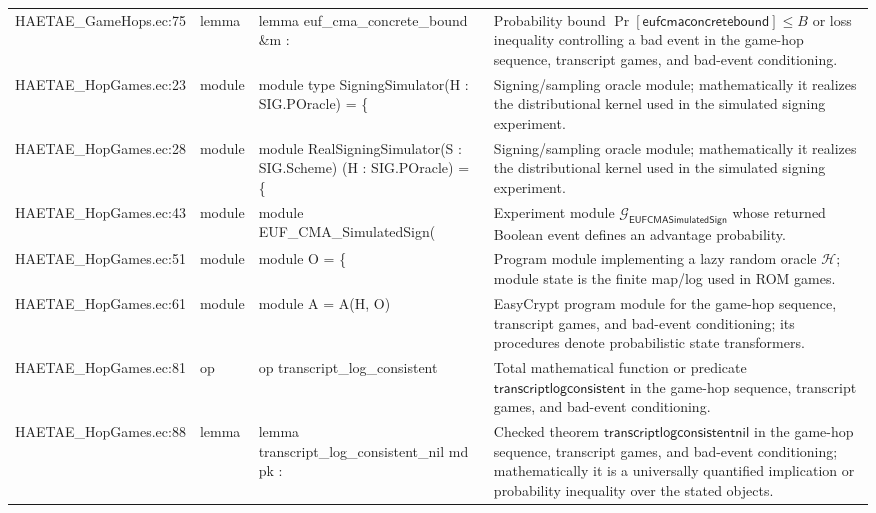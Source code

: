 \documentclass[10pt]{article}
\begin{document}
\begin{longtable}{L{0.11\textwidth}L{0.055\textwidth}L{0.385\textwidth}L{0.41\textwidth}}
HAETAE\_\allowbreak{}GameHops.\allowbreak{}ec:\allowbreak{}75 & lemma & {\ttfamily\scriptsize lemma euf\_\allowbreak{}cma\_\allowbreak{}concrete\_\allowbreak{}bound \&m :} & Probability bound $\Pr[\mathsf{eufcmaconcretebound}]\le B$ or loss inequality controlling a bad event in the game-hop sequence, transcript games, and bad-event conditioning. \\
HAETAE\_\allowbreak{}HopGames.\allowbreak{}ec:\allowbreak{}23 & module & {\ttfamily\scriptsize module type SigningSimulator(H : SIG.POracle) = \{} & Signing/sampling oracle module; mathematically it realizes the distributional kernel used in the simulated signing experiment. \\
HAETAE\_\allowbreak{}HopGames.\allowbreak{}ec:\allowbreak{}28 & module & {\ttfamily\scriptsize module RealSigningSimulator(S : SIG.Scheme) (H : SIG.POracle) = \{} & Signing/sampling oracle module; mathematically it realizes the distributional kernel used in the simulated signing experiment. \\
HAETAE\_\allowbreak{}HopGames.\allowbreak{}ec:\allowbreak{}43 & module & {\ttfamily\scriptsize module EUF\_\allowbreak{}CMA\_\allowbreak{}SimulatedSign(} & Experiment module $\mathcal G_{\mathsf{EUFCMASimulatedSign}}$ whose returned Boolean event defines an advantage probability. \\
HAETAE\_\allowbreak{}HopGames.\allowbreak{}ec:\allowbreak{}51 & module & {\ttfamily\scriptsize module O = \{} & Program module implementing a lazy random oracle $\mathcal H$; module state is the finite map/log used in ROM games. \\
HAETAE\_\allowbreak{}HopGames.\allowbreak{}ec:\allowbreak{}61 & module & {\ttfamily\scriptsize module A = A(H, O)} & EasyCrypt program module for the game-hop sequence, transcript games, and bad-event conditioning; its procedures denote probabilistic state transformers. \\
HAETAE\_\allowbreak{}HopGames.\allowbreak{}ec:\allowbreak{}81 & op & {\ttfamily\scriptsize op transcript\_\allowbreak{}log\_\allowbreak{}consistent} & Total mathematical function or predicate $\mathsf{transcriptlogconsistent}$ in the game-hop sequence, transcript games, and bad-event conditioning. \\
HAETAE\_\allowbreak{}HopGames.\allowbreak{}ec:\allowbreak{}88 & lemma & {\ttfamily\scriptsize lemma transcript\_\allowbreak{}log\_\allowbreak{}consistent\_\allowbreak{}nil md pk :} & Checked theorem $\mathsf{transcriptlogconsistentnil}$ in the game-hop sequence, transcript games, and bad-event conditioning; mathematically it is a universally quantified implication or probability inequality over the stated objects. \\

\end{longtable}
\end{document}
